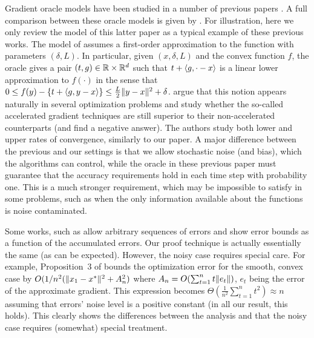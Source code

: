 Gradient oracle models have been studied in a number of previous papers 
\citep{dAsp08,Baes09,SchRoBa11,DeGliNe14}.
A full comparison between these oracle models is given by \cite{DeGliNe14}.
For illustration, here we only review the model of this latter paper as a typical example of these previous works.
The model of \cite{DeGliNe14} assumes a first-order approximation to the function
with parameters $(\delta,L)$. In particular, 
given $(x,\delta,L)$ and the convex function $f$, 
the oracle gives a pair $(t,g)\in \mathbb{R} \times \mathbb{R}^d$
such that $t + \langle g,\cdot-x \rangle$ is a linear lower approximation to $f(\cdot)$ in the sense that 
$0\le f(y) - \left\{ t+ \langle g,y-x \rangle\right\} \le \frac{L}{2} \|y-x\|^2 + \delta$.
\cite{DeGliNe14} argue that this notion appears naturally in several optimization problems and study whether the so-called accelerated gradient techniques are still superior to their non-accelerated counterparts (and find a negative answer).
The authors study both lower and upper rates of convergence, similarly to our paper.
A major difference between the previous and our settings is that we allow stochastic noise (and bias), which the algorithms can control, while the oracle in these previous paper must guarantee that the accuracy requirements hold in each time step
with probability one.
This is a much stronger requirement, which may be impossible to satisfy in some problems, such as when 
the only information available about the functions is noise contaminated.

Some works, such as \citet{SchRoBa11} allow arbitrary sequences of errors and show error bounds as a function
of the accumulated errors. 
Our proof technique is actually essentially the same (as can be expected).
However, the noisy case requires special care. For example, Proposition~3 of
\citet{SchRoBa11}  bounds the optimization error for the smooth, convex case by 
$O(1/n^2 ( \|x_1-x^*\|^2 + A_n^2 )$ where $A_n = O( \sum_{t=1}^n t \|e_t\|)$, $e_t$ being the error of the approximate gradient. This expression becomes $\Theta(\frac{1}{n^2} \sum_{t=1}^n t^2)  \approx n$
assuming that errors' noise level is a positive constant (in all our result, this holds).
This clearly shows the differences between the analysis and that the noisy case requires (somewhat) special treatment.

